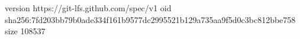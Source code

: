 version https://git-lfs.github.com/spec/v1
oid sha256:7fd203bb79b0ade334f161b9577dc2995521b129a735aa9f5d0c3bc812bbe758
size 108537
